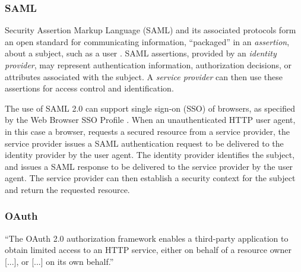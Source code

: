 \subsubsection{SAML}
Security Assertion Markup Language (SAML) and its associated protocols form an open standard for communicating information, ``packaged'' in an \emph{assertion}, about a subject, such as a user \autocite{Kemp2005}. SAML assertions, provided by an \emph{identity provider}, may represent authentication information, authorization decisions, or attributes associated with the subject. A \emph{service provider} can then use these assertions for access control and identification.

The use of SAML 2.0 can support single sign-on (SSO) of browsers, as specified by the Web Browser SSO Profile \autocite{Hughes2005}. When an unauthenticated HTTP user agent, in this case a browser, requests a secured resource from a service provider, the service provider issues a SAML authentication request to be delivered to the identity provider by the user agent. The identity provider identifies the subject, and issues a SAML response to be delivered to the service provider by the user agent. The service provider can then establish a security context for the subject and return the requested resource. 

\subsubsection{OAuth}
``The OAuth 2.0 authorization framework enables a third-party
application to obtain limited access to an HTTP service, either on
behalf of a resource owner [...], or [...] on its own behalf.'' \autocite{Hardt2023}


